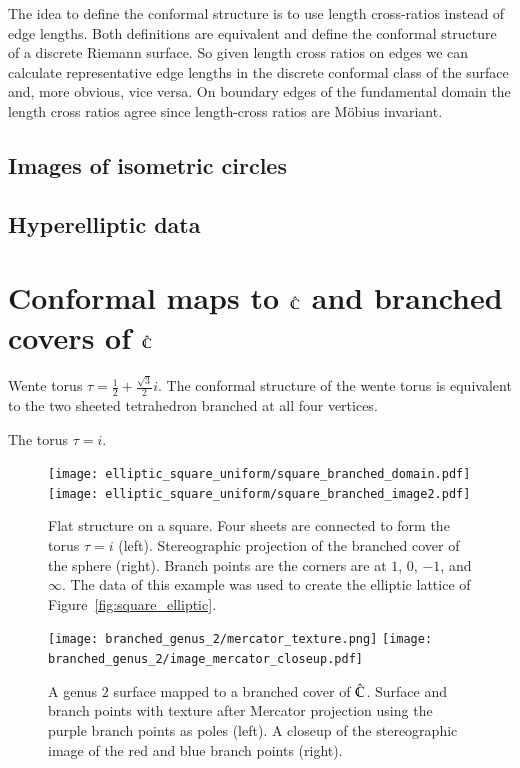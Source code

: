 \documentclass[Thesis.tex]{subfiles}
\begin{document}
The idea to define the conformal structure is to use length cross-ratios instead of edge lengths. Both definitions are equivalent and define the conformal structure of a discrete Riemann surface. So given length cross ratios on edges we can calculate representative edge lengths in the discrete conformal class of the surface and, more obvious, vice versa. On boundary edges of the fundamental domain the length cross ratios agree since length-cross ratios are M{\" o}bius invariant.




\subsection{Images of isometric circles}
\subsection{Hyperelliptic data}

\section{Conformal maps to $\hat{\mathbb C}$ and branched covers of $\hat{\mathbb C}$}

\begin{example}
\label{ex:wente_branched}
Wente torus $\tau=\frac{1}{2}+\frac{\sqrt 3}{2}i$. The conformal structure of the wente torus is equivalent to the two sheeted tetrahedron branched at all four vertices.
\end{example}

\begin{example}
\label{ex:square_branched}
The torus $\tau=i$.
\end{example}

\begin{figure}
\centering
\texttt{[image: elliptic\_square\_uniform/square\_branched\_domain.pdf]}
\texttt{[image: elliptic\_square\_uniform/square\_branched\_image2.pdf]}
\caption{Flat structure on a square. Four sheets are connected to form the torus $\tau=i$ (left).
Stereographic projection of the branched cover of the sphere (right). Branch points are the corners are at $1$, $0$, $-1$, and $\infty$. The data of this example was used to create the elliptic lattice of
Figure~\ref{fig:square_elliptic}.}
\label{fig:square_branched}
\end{figure}

\begin{figure}
\centering
\texttt{[image: branched\_genus\_2/mercator\_texture.png]}
\texttt{[image: branched\_genus\_2/image\_mercator\_closeup.pdf]}
\caption{A genus $2$ surface mapped to a branched cover of $\hat{\mathbb C}$.  Surface and branch points with texture after Mercator projection using the purple branch points as poles (left). A closeup of the stereographic image of the red and blue branch points (right).}
\label{fig:genus2_branched}
\end{figure}
\end{document}
